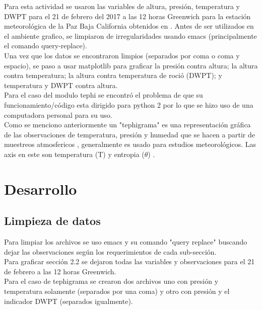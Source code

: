 \documentclass[12pt,letterpaper]{article}
\begin{document}
Para esta actividad se usaron las variables de altura, presión, temperatura y DWPT para el 21 de febrero del 2017 a las 12 horas Greenwich para la estación meteorológica de la Paz Baja California obtenidos en \cite{c}. Antes de ser utilizados en el ambiente grafico, se limpiaron de irregularidades usando emacs (principalmente el comando query-replace).\\

Una vez que los datos se encontraron limpios (separados por coma o coma y espacio), se paso a usar matplotlib para graficar la presión contra altura; la altura contra temperatura; la altura contra temperatura de roció (DWPT); y temperatura y DWPT contra altura.\\
Para el caso del modulo tephi se encontró el problema de que su funcionamiento/código esta dirigido para python 2 por lo que se hizo uso de una computadora personal para su uso.\\
Como se menciono anteriormente un "tephigrama" es una representación gráfica de las observaciones de temperatura, presión y humedad que se hacen a partir de muestreos atmosfericos \cite{f}, generalmente es usado para estudios meteorológicos. Las axis en este son temperatura (T) y entropia ($\theta$) \cite{g}.



\section{Desarrollo}

\subsection{Limpieza de datos}


Para limpiar los archivos se uso emacs y su comando "query replace" buscando dejar las observaciones según los requerimientos de cada sub-sección.\\
Para graficar sección 2.2 se dejaron todas las variables y observaciones para el 21 de febrero a las 12 horas Greenwich.\\
Para el caso de tephigrama se crearon dos archivos uno con presión y temperatura solamente (separados por una coma) y otro con presión y el indicador DWPT (separados igualmente).\\
\end{document}
